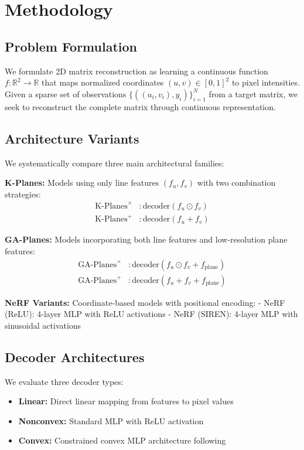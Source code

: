 \documentclass{article}
\begin{document}
\section{Methodology}

\subsection{Problem Formulation}

We formulate 2D matrix reconstruction as learning a continuous function $f: \mathbb{R}^2 \rightarrow \mathbb{R}$ that maps normalized coordinates $(u, v) \in [0,1]^2$ to pixel intensities. Given a sparse set of observations $\{((u_i, v_i), y_i)\}_{i=1}^N$ from a target matrix, we seek to reconstruct the complete matrix through continuous representation.

\subsection{Architecture Variants}

We systematically compare three main architectural families:

\textbf{K-Planes:} Models using only line features $(f_u, f_v)$ with two combination strategies:
\begin{align}
\text{K-Planes}^\times &: \text{decoder}(f_u \odot f_v) \\
\text{K-Planes}^+ &: \text{decoder}(f_u + f_v)
\end{align}

\textbf{GA-Planes:} Models incorporating both line features and low-resolution plane features:
\begin{align}
\text{GA-Planes}^\times &: \text{decoder}(f_u \odot f_v + f_{\text{plane}}) \\
\text{GA-Planes}^+ &: \text{decoder}(f_u + f_v + f_{\text{plane}})
\end{align}

\textbf{NeRF Variants:} Coordinate-based models with positional encoding:
- NeRF (ReLU): 4-layer MLP with ReLU activations
- NeRF (SIREN): 4-layer MLP with sinusoidal activations

\subsection{Decoder Architectures}

We evaluate three decoder types:
\begin{itemize}
\item \textbf{Linear:} Direct linear mapping from features to pixel values
\item \textbf{Nonconvex:} Standard MLP with ReLU activation
\item \textbf{Convex:} Constrained convex MLP architecture following \citet{sivgin2024gaplanes}
\end{itemize}
\end{document}
